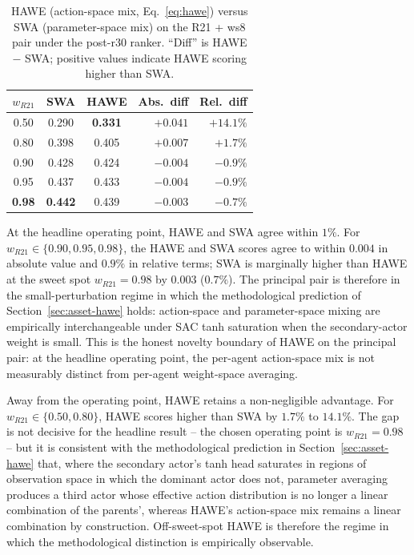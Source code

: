 \documentclass{unnc-fyp}
\begin{document}
\begin{table}[tb]
  \centering
  \small
  \caption{HAWE (action-space mix, Eq.~\eqref{eq:hawe}) versus
           SWA (parameter-space mix) on the R21 + ws8 pair under
           the post-r30 ranker. ``Diff'' is HAWE $-$ SWA;
           positive values indicate HAWE scoring higher than SWA.}
  \label{tab:s2-hawe-vs-swa}
  \begin{tabular}{@{}cccrr@{}}
    \toprule
    $w_{R21}$
      & SWA & HAWE & Abs.\ diff & Rel.\ diff \\
    \midrule
    0.50 & 0.290 & \textbf{0.331} & $+0.041$ & $+14.1\%$ \\
    0.80 & 0.398 & 0.405          & $+0.007$ & $+1.7\%$ \\
    0.90 & 0.428 & 0.424          & $-0.004$ & $-0.9\%$ \\
    0.95 & 0.437 & 0.433          & $-0.004$ & $-0.9\%$ \\
    \textbf{0.98}
         & \textbf{0.442} & 0.439 & $-0.003$ & $-0.7\%$ \\
    \bottomrule
  \end{tabular}
\end{table}

At the headline operating point, HAWE and SWA agree within $1\%$.
For $w_{R21} \in \{0.90, 0.95, 0.98\}$, the HAWE and SWA scores
agree to within $0.004$ in absolute value and $0.9\%$ in relative
terms; SWA is marginally higher than HAWE at the sweet spot
$w_{R21} = 0.98$ by $0.003$ ($0.7\%$).
The principal pair is therefore in the small-perturbation regime
in which the methodological prediction of
Section~\ref{sec:asset-hawe} holds: action-space and
parameter-space mixing are empirically interchangeable under SAC
tanh saturation when the secondary-actor weight is small.
This is the honest novelty boundary of HAWE on the principal
pair: at the headline operating point, the per-agent action-space
mix is not measurably distinct from per-agent weight-space
averaging.

Away from the operating point, HAWE retains a non-negligible advantage.
For $w_{R21} \in \{0.50, 0.80\}$, HAWE scores higher than SWA by
$1.7\%$ to $14.1\%$.
The gap is not decisive for the headline result -- the chosen
operating point is $w_{R21} = 0.98$ -- but it is consistent with
the methodological prediction in Section~\ref{sec:asset-hawe}
that, where the secondary actor's tanh head saturates in regions
of observation space in which the dominant actor does not,
parameter averaging produces a third actor whose effective action
distribution is no longer a linear combination of the parents',
whereas HAWE's action-space mix remains a linear combination by
construction.
Off-sweet-spot HAWE is therefore the regime in which the
methodological distinction is empirically observable.
\end{document}
